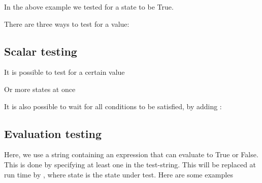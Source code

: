 \documentclass[letterpaper,10pt,english]{sphinxmanual}
\begin{document}
In the above example we tested for a state to be True.

There are three ways to test for a value:


\subsection{Scalar testing}
\label{\detokenize{State:scalar-testing}}
It is possible to test for a certain value

\begin{sphinxVerbatim}[commandchars=\\\{\}]
  
\end{sphinxVerbatim}

Or more states at once

\begin{sphinxVerbatim}[commandchars=\\\{\}]
     
      
\end{sphinxVerbatim}

It is also possible to wait for all conditions to be satisfied, by adding :

\begin{sphinxVerbatim}[commandchars=\\\{\}]
     
\end{sphinxVerbatim}


\subsection{Evaluation testing}
\label{\detokenize{State:evaluation-testing}}
Here, we use a string containing an expression that can evaluate to True or False. This is
done by specifying at least one \sphinxcode{\$} in the test-string. This \sphinxcode{\$} will be replaced at run time by
, where state is the state under test. Here are some examples
\end{document}
